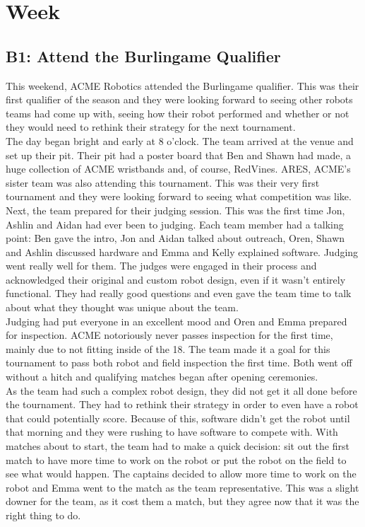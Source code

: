 \documentclass{article}
\begin{document}
\clearpage \newpage \section{Week \thesection} 
\subsection{B1: Attend the Burlingame Qualifier}

This weekend, ACME Robotics attended the Burlingame qualifier. This was their first qualifier of the season and they were looking forward to seeing other robots teams had come up with, seeing how their robot performed and whether or not they would need to rethink their strategy for the next tournament.\\

The day began bright and early at 8 o'clock. The team arrived at the venue and set up their pit. Their pit had a poster board that Ben and Shawn had made, a huge collection of ACME wristbands and, of course, RedVines. ARES, ACME's sister team was also attending this tournament. This was their very first tournament and they were looking forward to seeing what competition was like. \\

Next, the team prepared for their judging session. This was the first time Jon, Ashlin and Aidan had ever been to judging. Each team member had a talking point: Ben gave the intro, Jon and Aidan talked about outreach, Oren, Shawn and Ashlin discussed hardware and Emma and Kelly explained software. Judging went really well for them. The judges were engaged in their process and acknowledged their original and custom robot design, even if it wasn't entirely functional. They had really good questions and even gave the team time to talk about what they thought was unique about the team. \\

Judging had put everyone in an excellent mood and Oren and Emma prepared for inspection. ACME notoriously never passes inspection for the first time, mainly due to not fitting inside of the 18. The team made it a goal for this tournament to pass both robot and field inspection the first time. Both went off without a hitch and qualifying matches began after opening ceremonies. \\

As the team had such a complex robot design, they did not get it all done before the tournament. They had to rethink their strategy in order to even have a robot that could potentially score. Because of this, software didn't get the robot until that morning and they were rushing to have software to compete with. With matches about to start, the team had to make a quick decision: sit out the first match to have more time to work on the robot or put the robot on the field to see what would happen. The captains decided to allow more time to work on the robot and Emma went to the match as the team representative. This was a slight downer for the team, as it cost them a match, but they agree now that it was the right thing to do. \\
\end{document}
